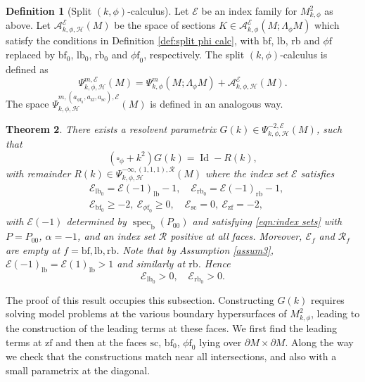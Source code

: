 \documentclass[JEP,XML,SOM,Unicode,NoFloatCountersInSection,published]{cedram}
\theoremstyle{plain}
\newtheorem{Th}{Theorem}[section]
\theoremstyle{definition}
\newtheorem{defn}[Th]{Definition}
\newcommand\calA{{\mathcal A}}
\newcommand\calE{{\mathcal E}}
\newcommand{\calH}{{\mathscr{H}}}
\newcommand\calR{{\mathcal R}}
\newcommand{\phif}{{\phi\mathrm{f}}}
\newcommand{\lf}{{\mathrm{lb}}}
\newcommand{\rf}{{\mathrm{rb}}}
\newcommand{\bb}{{\mathrm{b}}}
\newcommand{\lfz}{{\mathrm{lb}_0}}
\newcommand{\rfz}{{\mathrm{rb}_0}}
\newcommand{\bbf}{{\mathrm{bf}}}
\newcommand{\bbfz}{{\bbf_0}}
\newcommand{\ssc}{{\mathrm{sc}}}
\newcommand{\zf}{{\mathrm{zf}}}
\DeclareMathOperator{\Id}{Id}
\DeclareMathOperator\spec{spec}
\begin{document}
\begin{defn}[Split $(k,\phi)$-calculus]\label{def:split k phi calculus}
Let $\calE$ be an index family for $M^2_{k,\phi}$ as above.
Let $\calA^\calE_{k,\phi,\mathscr{H}}(M)$ be the space of sections $K\in \calA^{\calE}_{k,\phi}(M;\Lambda_\phi M)$ which satisfy the conditions in Definition \ref{def:split phi calc}, with $\bbf$, $\lf$, $\rf$ and $\phif$ replaced by $\bbf_0$, $\lf_0$, $\rf_0$ and
$\phif_0$, respectively. The split $(k,\phi)$-calculus is defined as
\[
\Psi^{m,\calE}_{k,\phi,\mathscr{H}}(M) = \Psi^{m}_{k,\phi}(M;\Lambda_\phi M) +
\calA^\calE_{k,\phi,\mathscr{H}}(M).
\]
The space $\Psi_{k,\phi,\calH}^{m,(a_{\phif_0}, a_\zf,a_\ssc),\calE}(M)$ is defined in an analogous way.

\end{defn}

\label{subsec:intl param}

\begin{Th}\label{initial resl phi}
There exists a resolvent parametrix $G(k)\in \Psi^{-2,\calE}_{k,\phi,\mathscr{H}}(M)$,
such that
\[
(\square_\phi+k^2) G(k) = \Id - R(k),
\]
with remainder $R(k)\in \Psi^{-\infty,(1,1,1),\calR}_{k,\phi,\mathscr{H}}(M)$
where the index set $\calE$ satisfies
\begin{equation}
\label{eqn:ind set k phi para}
\begin{split}
&\calE_{\lfz}=\calE(-1)_\lf-1,\quad \calE_\rfz=\calE(-1)_\rf-1,
\\ &\calE_\bbfz\geq-2,\ \calE_{\phif_0}\geq0,\quad \calE_\ssc=0,\ \calE_\zf=-2,
\end{split}
\end{equation}
with $\calE(-1)$ determined by $\spec_\bb(P_{00})$ and satisfying \eqref{eqn:index sets}
with $P=P_{00}$, $\alpha=-1$, and an index set $\calR$ positive at all faces.
Moreover, $\calE_f$ and $\calR_f$ are empty at $f=\bbf,\lf,\rf$. Note that by Assumption
\ref{assum3}, $\calE(-1)_\lf= \calE(1)_\lf > 1$ and similarly at $\rf$. Hence
\begin{equation}
\label{eqn: lf rf positive}
\calE_{\lfz}>0,\quad \calE_\rfz>0.
\end{equation}

\end{Th}

The proof of this result occupies this subsection.
Constructing $G(k)$ requires solving model problems at the various boundary
hypersurfaces of $M^2_{k,\phi}$, leading to the construction of the leading terms at these faces.
We first find the leading terms at $\zf$ and then at the faces $\ssc$, $\bbf_0$, $\phif_0$ lying over $\partial M\times\partial M$. Along the way we check that the constructions match near all intersections, and also with a small parametrix at the diagonal.
\end{document}
